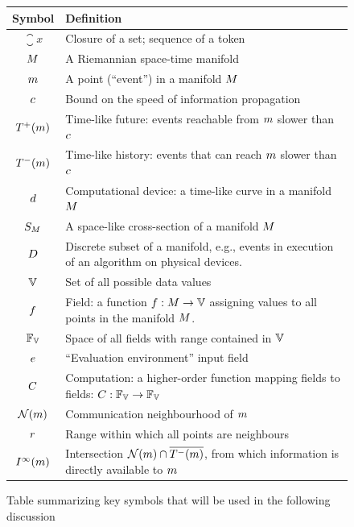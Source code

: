 \documentclass[12pt,a4paper,twoside,openright]{book}
\begin{document}
\begin{figure}
\centering
\begin{tabular}{|cp{}|}
\hline
Symbol & Definition \\
\hline
$\closure{x}$             & Closure of a set; sequence of a token \\
\hline %
$M$               & A Riemannian space-time manifold \\
$m$                  & A point (``event'') in a manifold $M$ \\
$c$              & Bound on the speed of information propagation \\
$T^+({m})$       & Time-like future: events reachable from $m$ slower than $c$\\
$T^-({m})$         & Time-like history: events that can reach $m$ slower than $c$ \\
$d$                 & Computational device: a time-like curve in a manifold $M$ \\
$S_{M}$   & A space-like cross-section of a manifold $M$\\
$D$            & Discrete subset of a manifold, e.g., events in execution of an algorithm on physical devices.\\
\hline %
$\spaceof{\datavalue}$    & Set of all possible data values \\
$f$                  & Field: a function $\field: \manifold \rightarrow \spaceof{\datavalue}$ assigning values to all points in the manifold $M$. \\
$\fieldsof{\spaceof{\datavalue}}$ & Space of all fields with range contained in $\spaceof{\datavalue}$ \\
$e$            & ``Evaluation environment'' input field \\
$C$            & Computation: a higher-order function mapping fields to fields: $\computation: \fieldsof{\spaceof{\datavalue}} \rightarrow \fieldsof{\spaceof{\datavalue}}$ \\
\hline
$\mathcal{N}(m)$         & Communication neighbourhood of $m$ \\
$r$             & Range within which all points are neighbours \\
$I^\infty(m)$     & Intersection $\mathcal{N}(m) \cap \overline{T^-({m})}$, from which information is directly available to $m$\\
\hline
\end{tabular}
\caption{Table summarizing key symbols that will be used in the following discussion}
\label{f:symbols}
\end{figure}
\end{document}
